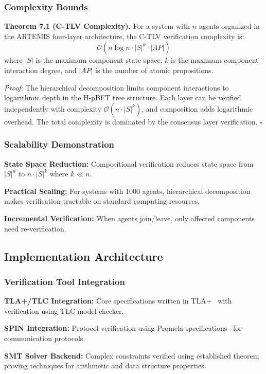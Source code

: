 \documentclass[conference]{IEEEtran}
\newcommand{\bigO}{\mathcal{O}}
\begin{document}
\subsubsection{Complexity Bounds}

\textbf{Theorem 7.1 (C-TLV Complexity).} For a system with $n$ agents organized in the ARTEMIS four-layer architecture, the C-TLV verification complexity is:
$$\bigO(n \log n \cdot |S|^{k} \cdot |AP|)$$
where $|S|$ is the maximum component state space, $k$ is the maximum component interaction degree, and $|AP|$ is the number of atomic propositions.

\textit{Proof:} The hierarchical decomposition limits component interactions to logarithmic depth in the H-pBFT tree structure. Each layer can be verified independently with complexity $\bigO(n \cdot |S|^{k})$, and composition adds logarithmic overhead. The total complexity is dominated by the consensus layer verification. $\square$

\subsubsection{Scalability Demonstration}

\textbf{State Space Reduction:} Compositional verification reduces state space from $|S|^n$ to $n \cdot |S|^{k}$ where $k \ll n$.

\textbf{Practical Scaling:} For systems with 1000 agents, hierarchical decomposition makes verification tractable on standard computing resources.

\textbf{Incremental Verification:} When agents join/leave, only affected components need re-verification.

\subsection{Implementation Architecture}

\subsubsection{Verification Tool Integration}

\textbf{TLA+/TLC Integration:} Core specifications written in TLA+~\cite{lamport2002specifying} with verification using TLC model checker.

\textbf{SPIN Integration:} Protocol verification using Promela specifications~\cite{holzmann2003spin} for communication protocols.

\textbf{SMT Solver Backend:} Complex constraints verified using established theorem proving techniques for arithmetic and data structure properties.
\end{document}
